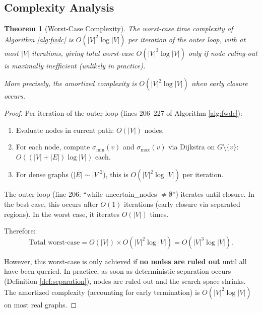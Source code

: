 \documentclass[twocolumn,11pt,a4paper]{article}
\newtheorem{theorem}{Theorem}[section]
\theoremstyle{definition}
\begin{document}
\subsection{Complexity Analysis}

\begin{theorem}[Worst-Case Complexity]
\label{thm:complexity}
The worst-case time complexity of Algorithm \ref{alg:fwdc} is $O(|V|^2 \log |V|)$ per iteration of the outer loop, with at most $|V|$ iterations, giving total worst-case $O(|V|^3 \log |V|)$ only if node ruling-out is maximally inefficient (unlikely in practice).

More precisely, the amortized complexity is $O(|V|^2 \log |V|)$ when early closure occurs.
\end{theorem}

\begin{proof}
Per iteration of the outer loop (lines 206--227 of Algorithm \ref{alg:fwdc}):
\begin{enumerate}
\item Evaluate nodes in current path: $O(|V|)$ nodes.
\item For each node, compute $\sigma_{\min}(v)$ and $\sigma_{\max}(v)$ via Dijkstra on $G \setminus \{v\}$: $O((|V| + |E|) \log |V|)$ each.
\item For dense graphs ($|E| \sim |V|^2$), this is $O(|V|^2 \log |V|)$ per iteration.
\end{enumerate}

The outer loop (line 206: ``while uncertain\_nodes $\neq \emptyset$'') iterates until closure. In the best case, this occurs after $O(1)$ iterations (early closure via separated regions). In the worst case, it iterates $O(|V|)$ times.

Therefore:
\begin{equation}
\text{Total worst-case} = O(|V|) \times O(|V|^2 \log |V|) = O(|V|^3 \log |V|).
\end{equation}

However, this worst-case is only achieved if \textbf{no nodes are ruled out} until all have been queried. In practice, as soon as deterministic separation occurs (Definition \ref{def:separation}), nodes are ruled out and the search space shrinks. The amortized complexity (accounting for early termination) is $O(|V|^2 \log |V|)$ on most real graphs.
\end{proof}
\end{document}
